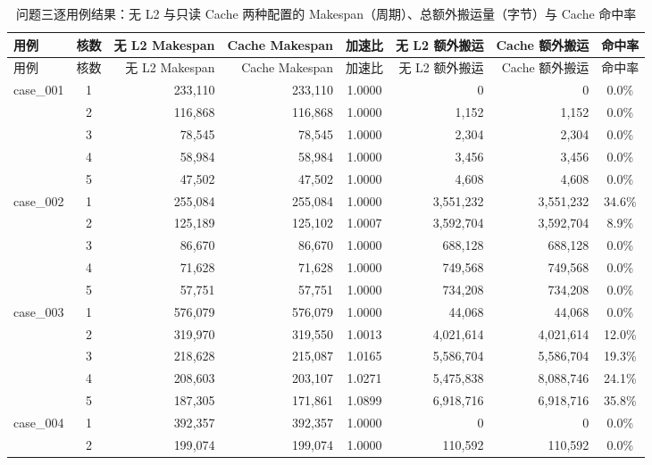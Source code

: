 \begin{footnotesize}
\setlength{\tabcolsep}{3.2pt}
\begin{longtable}{l c rr c rr c}
\caption{问题三逐用例结果：无 L2 与只读 Cache 两种配置的 Makespan（周期）、总额外搬运量（字节）与 Cache 命中率}\label{tab:app-p3}\\
\toprule
用例 & 核数 & 无 L2 Makespan & Cache Makespan & 加速比 & 无 L2 额外搬运 & Cache 额外搬运 & 命中率 \\
\midrule
\endfirsthead
\toprule
用例 & 核数 & 无 L2 Makespan & Cache Makespan & 加速比 & 无 L2 额外搬运 & Cache 额外搬运 & 命中率 \\
\midrule
\endhead
\bottomrule
\endfoot
case\_001 & 1 & 233{,}110 & 233{,}110 & 1.0000 & 0 & 0 & 0.0\% \\
 & 2 & 116{,}868 & 116{,}868 & 1.0000 & 1{,}152 & 1{,}152 & 0.0\% \\
 & 3 & 78{,}545 & 78{,}545 & 1.0000 & 2{,}304 & 2{,}304 & 0.0\% \\
 & 4 & 58{,}984 & 58{,}984 & 1.0000 & 3{,}456 & 3{,}456 & 0.0\% \\
 & 5 & 47{,}502 & 47{,}502 & 1.0000 & 4{,}608 & 4{,}608 & 0.0\% \\
\addlinespace[2pt]
case\_002 & 1 & 255{,}084 & 255{,}084 & 1.0000 & 3{,}551{,}232 & 3{,}551{,}232 & 34.6\% \\
 & 2 & 125{,}189 & 125{,}102 & 1.0007 & 3{,}592{,}704 & 3{,}592{,}704 & 8.9\% \\
 & 3 & 86{,}670 & 86{,}670 & 1.0000 & 688{,}128 & 688{,}128 & 0.0\% \\
 & 4 & 71{,}628 & 71{,}628 & 1.0000 & 749{,}568 & 749{,}568 & 0.0\% \\
 & 5 & 57{,}751 & 57{,}751 & 1.0000 & 734{,}208 & 734{,}208 & 0.0\% \\
\addlinespace[2pt]
case\_003 & 1 & 576{,}079 & 576{,}079 & 1.0000 & 44{,}068 & 44{,}068 & 0.0\% \\
 & 2 & 319{,}970 & 319{,}550 & 1.0013 & 4{,}021{,}614 & 4{,}021{,}614 & 12.0\% \\
 & 3 & 218{,}628 & 215{,}087 & 1.0165 & 5{,}586{,}704 & 5{,}586{,}704 & 19.3\% \\
 & 4 & 208{,}603 & 203{,}107 & 1.0271 & 5{,}475{,}838 & 8{,}088{,}746 & 24.1\% \\
 & 5 & 187{,}305 & 171{,}861 & 1.0899 & 6{,}918{,}716 & 6{,}918{,}716 & 35.8\% \\
\addlinespace[2pt]
case\_004 & 1 & 392{,}357 & 392{,}357 & 1.0000 & 0 & 0 & 0.0\% \\
 & 2 & 199{,}074 & 199{,}074 & 1.0000 & 110{,}592 & 110{,}592 & 0.0\% \\

\end{longtable}
\end{footnotesize}
